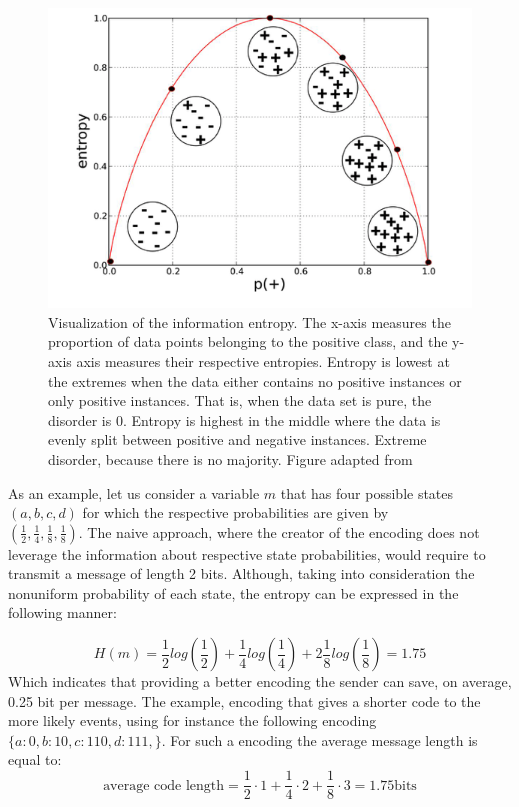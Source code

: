 \begin{figure}[h]
\centering
\includegraphics{figures/Entropy.png}
\caption{Visualization of the information entropy. The x-axis measures the proportion of data points belonging to the positive class, and the y-axis axis measures their respective entropies. Entropy is lowest at the extremes when the data either contains no positive instances or only positive instances. That is, when the data set is pure, the disorder is 0. Entropy is highest in the middle where the data is evenly split between positive and negative instances. Extreme disorder, because there is no majority. Figure adapted from~\cite{DS_for_buisness}   
\label{fig:entropy}}
\end{figure}

As an example, let us consider a variable $m$ that has four possible states \\ $(a, b, c, d)$ for which the respective probabilities are given by \\ $(\frac{1}{2},\frac{1}{4},\frac{1}{8},\frac{1}{8})$.
The naive approach, where the creator of the encoding does not leverage the information about respective state probabilities, would require to transmit a message of length 2 bits. Although, taking into consideration the nonuniform probability of each state, the entropy can be expressed in the following manner: 

\begin{equation}
    H(m) = \frac{1}{2} log(\frac{1}{2}) + \frac{1}{4}  log(\frac{1}{4}) + 2 \frac{1}{8} log(\frac{1}{8}) =1.75
\end{equation}
Which indicates that providing a better encoding the sender can save, on average, 0.25 bit per message. The example, encoding that gives a shorter code to the more likely events, using for instance the following encoding $\{a:0, b:10, c:110, d:111, \}$. For such a encoding the average message length is equal to: 
\begin{equation}
\label{eq:entropy example}
    \text{average code length}= \frac{1}{2}\cdot 1 + \frac{1}{4}\cdot 2 + \frac{1}{8}\cdot 3 = 1.75 \text{bits}
\end{equation}

